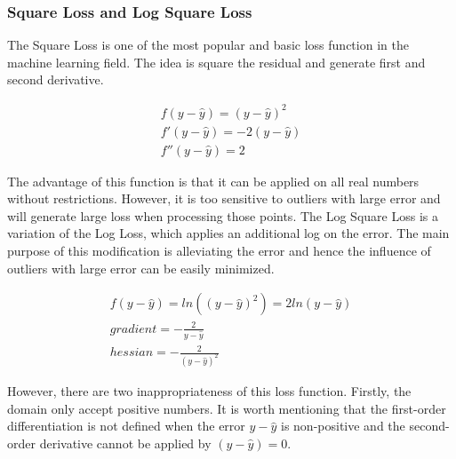 \documentclass[runningheads]{llncs}
\begin{document}
\subsubsection{Square Loss and Log Square Loss}
The Square Loss is one of the most popular and basic loss function in the machine learning field. The idea is square the residual and generate first and second derivative.

\begin{align}
  f(y-\hat{y}) = (y-\hat{y})^2 \\
  f'(y - \hat{y})= -2(y-\hat{y}) \\
  f''(y - \hat{y})= 2
\end{align}

The advantage of this function is that it can be applied on all real numbers without restrictions. However, it is too sensitive to outliers with large error and will generate large loss when processing those points. The Log Square Loss is a variation of the Log Loss, which applies an additional log on the error. The main purpose of this modification is alleviating the error and hence the influence of outliers with large error can be easily minimized. 

\begin{align}
	f(y - \hat{y}) = ln((y-\hat{y})^2) = 2ln(y-\hat{y}) \\
	gradient  = -\frac{2}{y - \hat{y}} \\
	hessian  = -\frac{2}{(y - \hat{y})^2}
\end{align}

However, there are two inappropriateness of this loss function. Firstly, the domain only accept positive numbers. It is worth mentioning that the first-order differentiation is not defined when the error $y-\hat{y}$ is non-positive and the second-order derivative cannot be applied by $(y-\hat{y}) = 0$. 
\end{document}
